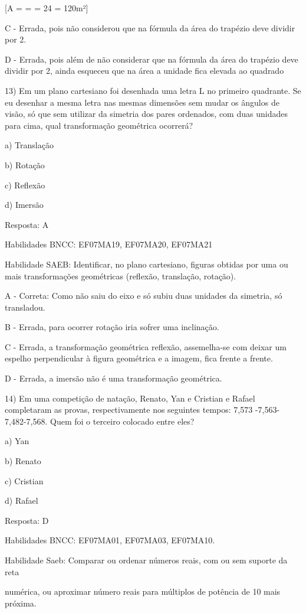 [A =  =  = 24  = 120m²]

C - Errada, pois não considerou que na fórmula da área do trapézio deve
dividir por 2.

D - Errada, pois além de não considerar que na fórmula da área do
trapézio deve dividir por 2, ainda esqueceu que na área a unidade fica
elevada ao quadrado

13) Em um plano cartesiano foi desenhada uma letra L no primeiro
quadrante. Se eu desenhar a mesma letra nas mesmas dimensões sem mudar
os ângulos de visão, só que sem utilizar da simetria dos pares
ordenados, com duas unidades para cima, qual transformação geométrica
ocorrerá?

a) Translação

b) Rotação

c) Reflexão

d) Imersão

Resposta: A

Habilidades BNCC: EF07MA19, EF07MA20, EF07MA21

Habilidade SAEB: Identificar, no plano cartesiano, figuras obtidas por
uma ou~ mais transformações geométricas (reflexão, translação, rotação).

A - Correta: Como não saiu do eixo e só subiu duas unidades da simetria,
só transladou.

B - Errada, para ocorrer rotação iria sofrer uma inclinação.

C - Errada, a transformação geométrica reflexão, assemelha-se com deixar
um espelho perpendicular à figura geométrica e a imagem, fica frente a
frente.

D - Errada, a imersão não é uma transformação geométrica.

14) Em uma competição de natação, Renato, Yan e Cristian e Rafael
completaram as provas, respectivamente nos seguintes tempos: 7,573
-7,563- 7,482-7,568. Quem foi o terceiro colocado entre eles?

a) Yan

b) Renato

c) Cristian

d) Rafael

Resposta: D

Habilidades BNCC: EF07MA01, EF07MA03, EF07MA10.

Habilidade Saeb: Comparar ou ordenar números reais, com ou sem suporte
da reta

numérica, ou aproximar número reais para múltiplos de potência de 10
mais próxima.

